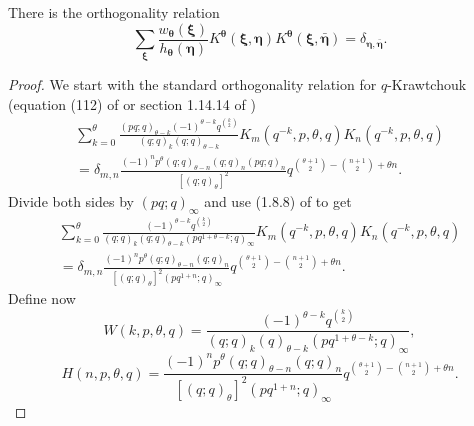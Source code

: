 \documentclass{ximera}
\begin{document}
\begin{lemma}\label{lemma:2}  There is the orthogonality relation
$$
\sum_{\boldsymbol\xi} \frac{w_{\boldsymbol\theta}(\boldsymbol\xi)}{h_{\boldsymbol\theta}(\boldsymbol\eta)} K^{\boldsymbol\theta}(\boldsymbol\xi,\boldsymbol\eta) K^{\boldsymbol\theta}(\boldsymbol\xi,\boldsymbol{\bar{\eta}}) = \delta_{\boldsymbol\eta,\bar{\boldsymbol\eta}}.
$$
\end{lemma}
\begin{proof}

We start with the standard orthogonality relation for $q$-Krawtchouk (equation (112) of \cite{CFG21} or section 1.14.14 of \cite{KLS})
\begin{multline*}
     \sum_{k=0}^{\theta}\frac{(pq;q)_{\theta-k}(-1)^{\theta-k}q^{\binom{k}{2}}}{(q;q)_k(q;q)_{\theta-k}}K_m(q^{-k},p,\theta,q)K_n(q^{-k},p,\theta,q)\\
     =\delta_{m,n}\frac{(-1)^np^{\theta}(q;q)_{\theta-n}(q;q)_n(pq;q)_n}{[(q;q)_{\theta}]^2}q^{\binom{\theta+1}{2}-\binom{n+1}{2}+\theta n}.
\end{multline*}
Divide both sides by $(pq;q)_\infty$ and use (1.8.8) of  \cite{KLS}  to get 
\begin{multline*}
     \sum_{k=0}^{\theta}\frac{(-1)^{\theta-k}q^{\binom{k}{2}}}{(q;q)_k(q;q)_{\theta-k}(pq^{1+\theta-k};q)_\infty}K_m(q^{-k},p,\theta,q)K_n(q^{-k},p,\theta,q)\\
     =\delta_{m,n}\frac{(-1)^np^{\theta}(q;q)_{\theta-n}(q;q)_n}{[(q;q)_{\theta}]^2(pq^{1+n};q)_\infty}q^{\binom{\theta+1}{2}-\binom{n+1}{2}+\theta n}.
\end{multline*}
Define now
\begin{equation*}
    W(k,p,\theta,q)=\frac{(-1)^{\theta-k}q^{\binom{k}{2}}}{(q;q)_k(q)_{\theta-k}(pq^{1+\theta-k};q)_\infty},
\end{equation*}
\begin{equation*}
    H(n,p,\theta,q)=\frac{(-1)^np^{\theta}(q;q)_{\theta-n}(q;q)_n}{[(q;q)_{\theta}]^2(pq^{1+n};q)_\infty}q^{\binom{\theta+1}{2}-\binom{n+1}{2}+\theta n}.
\end{equation*}


\end{proof}
\end{document}

